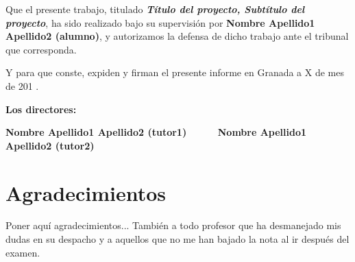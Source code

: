 Que el presente trabajo, titulado \textit{\textbf{Título del proyecto, Subtítulo del proyecto}},
ha sido realizado bajo su supervisión por \textbf{Nombre Apellido1 Apellido2 (alumno)}, y autorizamos la defensa de dicho trabajo ante el tribunal
que corresponda.

\vspace{0.5cm}

Y para que conste, expiden y firman el presente informe en Granada a X de mes de 201 .

\vspace{1cm}

\textbf{Los directores:}

\vspace{5cm}

\noindent \textbf{Nombre Apellido1 Apellido2 (tutor1) \ \ \ \ \ Nombre Apellido1 Apellido2 (tutor2)}

\chapter*{Agradecimientos}
\thispagestyle{empty}

       \vspace{1cm}


Poner aquí agradecimientos...
También a todo profesor que ha desmanejado mis dudas en su despacho y a aquellos que no me han bajado la nota al ir después del examen.


